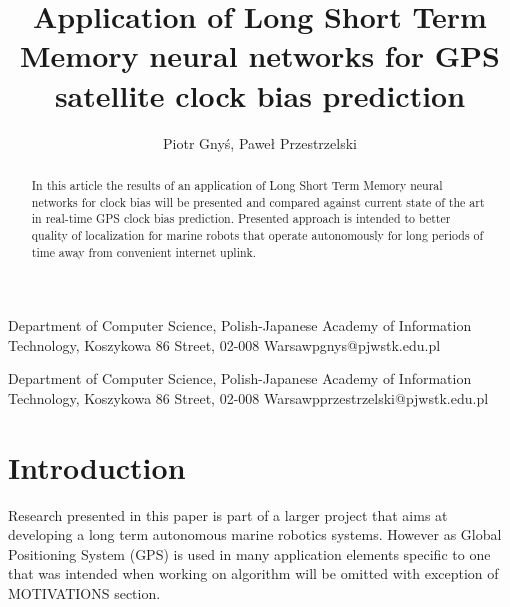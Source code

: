 \documentclass{kybernetika}
\begin{document}
\pagestyle{myheadings}
\title{Application of Long Short Term Memory neural networks for GPS satellite clock 
bias prediction}

\author{Piotr Gny\'{s}, Pawe\l{} Przestrzelski}

{Department of Computer Science,  Polish-Japanese Academy of Information Technology,
Koszykowa 86 Street, 02-008 Warsaw}{pgnys@pjwstk.edu.pl}

{Department of Computer Science,  Polish-Japanese Academy of Information Technology,
Koszykowa 86 Street, 02-008 Warsaw}{pprzestrzelski@pjwstk.edu.pl}


\maketitle

\begin{abstract}
In this article the results of an application of Long Short Term Memory neural networks for
clock bias will be presented and compared against current state of the art in real-time
GPS clock bias prediction. Presented approach is intended to better quality of localization
for marine robots that operate autonomously for long periods of time away from convenient  
internet uplink.
\end{abstract}




\section{Introduction}
Research presented in this paper is part of a larger project that aims at developing a long
term autonomous marine robotics systems. However as Global Positioning System (GPS) is used
in many application elements specific to one that was intended when working on algorithm will
be omitted with exception of MOTIVATIONS section.
\end{document}
